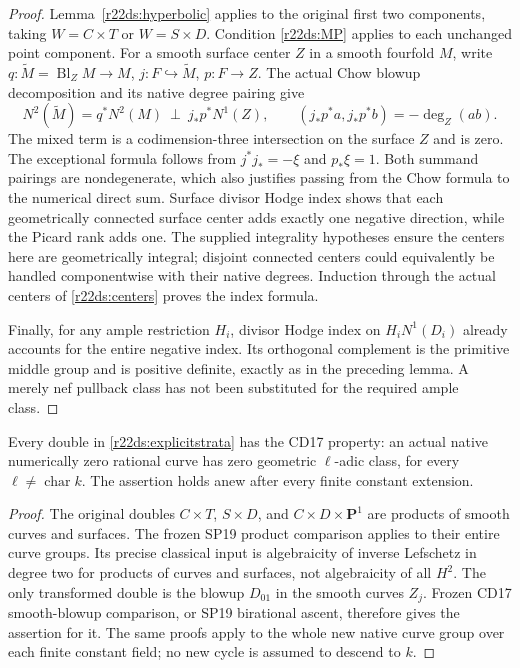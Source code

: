 \begin{proof}
Lemma~\ref{r22ds:hyperbolic} applies to the original first two
components, taking $W=C\times T$ or $W=S\times D$.
Condition \eqref{r22ds:MP} applies to each unchanged point component.
For a smooth surface center $Z$ in a smooth fourfold $M$, write
$q:\widetilde M=\operatorname{Bl}_ZM\to M$, $j:F\hookrightarrow
\widetilde M$, $p:F\to Z$.  The actual Chow blowup decomposition
and its native degree pairing give
\[
 N^2(\widetilde M)
           =q^*N^2(M)\ \perp\ j_*p^*N^1(Z),\qquad
 (j_*p^*a,j_*p^*b)=-\deg_Z(ab).
 \tag{DS22.10}\label{r22ds:blowupsignature}
\]
The mixed term is a codimension-three intersection on the surface
$Z$ and is zero.  The exceptional formula follows from
$j^*j_*=-\xi$ and $p_*\xi=1$.  Both summand pairings are
nondegenerate, which also justifies passing from the Chow formula
to the numerical direct sum.  Surface divisor Hodge index shows
that each geometrically connected surface center adds exactly one
negative direction, while the Picard rank adds one.  The supplied
integrality hypotheses ensure the centers here are geometrically
integral; disjoint connected centers could equivalently be handled
componentwise with their native degrees.  Induction through the
actual centers of \eqref{r22ds:centers} proves the index formula.

Finally, for any ample restriction $H_i$, divisor Hodge index on
$H_iN^1(D_i)$ already accounts for the entire negative index.
Its orthogonal complement is the primitive middle group and is
positive definite, exactly as in the preceding lemma.  A merely
nef pullback class has not been substituted for the required ample
class.
\end{proof}

\begin{lemma}
\label{r22ds:CD}
Every double in \eqref{r22ds:explicitstrata} has the CD17 property:
an actual native numerically zero rational curve has zero geometric
$\ell$-adic class, for every $\ell\ne\operatorname{char}k$.
The assertion holds anew after every finite constant extension.
\end{lemma}

\begin{proof}
The original doubles $C\times T$, $S\times D$, and
$C\times D\times\mathbf P^1$ are products of smooth curves and
surfaces.  The frozen SP19 product comparison applies to their
entire curve groups.  Its precise classical input is algebraicity
of inverse Lefschetz in degree two for products of curves and
surfaces, not algebraicity of all $H^2$.  The only transformed
double is the blowup $D_{01}$ in the smooth curves $Z_j$.
Frozen CD17 smooth-blowup comparison, or SP19 birational ascent,
therefore gives the assertion for it.  The same proofs apply to
the whole new native curve group over each finite constant field;
no new cycle is assumed to descend to $k$.
\end{proof}

